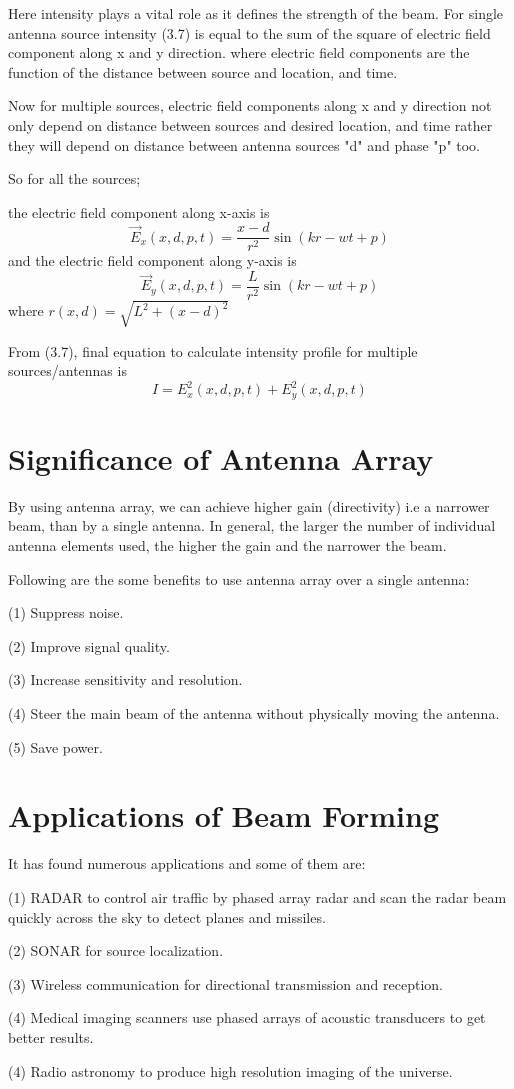 Here intensity plays a vital role as it defines the strength of the beam. For single antenna source intensity (3.7) is equal to the sum of the square of electric field component along x and y direction. where electric field components are the function of the distance between source and location, and time.

Now for multiple sources, electric field components along x and y direction not only depend on distance between sources and desired location, and time rather they will depend on distance between antenna sources "d" and phase "p" too.

So for all the sources;

the electric field component along x-axis is
\begin{equation}
\vec{E}_x(x,d,p,t) = \frac{x-d}{r^2}\sin(kr-wt+p)
\end{equation}
and the electric field component along y-axis is
\begin{equation}
\vec{E}_y(x,d,p,t) = \frac{L}{r^2}\sin(kr-wt+p)
\end{equation}
where $r(x,d) = \sqrt{L^2+(x-d)^2}$ 

From (3.7), final equation to calculate intensity profile for multiple sources/antennas is
\begin{equation}
I = E_x^2(x,d,p,t)+E_y^2(x,d,p,t)
\end{equation}

\section{Significance of Antenna Array}
By using antenna array, we can achieve higher gain (directivity) i.e a narrower beam, than by a single antenna. In general, the larger the number of individual antenna elements used, the higher the gain and the narrower the beam.

Following are the some benefits to use antenna array over a single antenna:

(1) Suppress noise.

(2) Improve signal quality.

(3) Increase sensitivity and resolution.

(4) Steer the main beam of the antenna without physically moving the antenna.

(5) Save power.

\section{Applications of Beam Forming}

It has found numerous applications and some of them are:

(1) RADAR to control air traffic by phased array radar and scan the radar beam quickly across the sky to detect planes and missiles.

(2) SONAR for source localization.

(3) Wireless communication for directional transmission and reception.

(4) Medical imaging scanners use phased arrays of acoustic transducers to get better results.

(4) Radio astronomy to produce high resolution imaging of the universe. 
